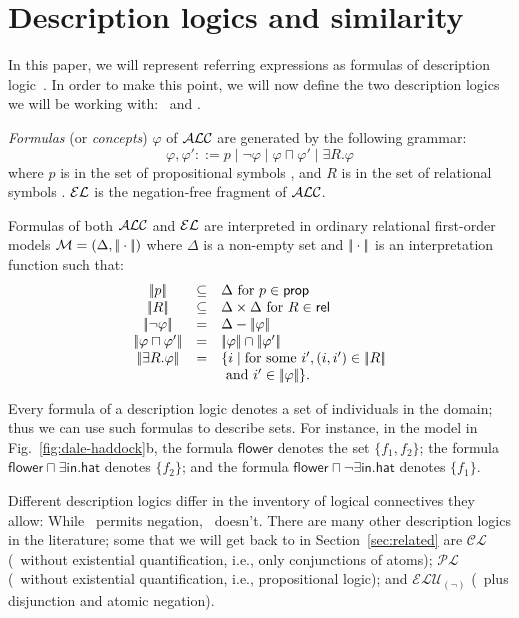 \section{Description logics and similarity}
\label{sec:bisim}

In this paper, we will represent referring expressions as formulas of
description logic~\cite{baad:desc03}.  In order to make this point, we
will now define the two description logics we will be working with:
\alc\ and \el.

\emph{Formulas} (or \emph{concepts}) $\varphi$ of $\mathcal{ALC}$ are generated
by the following grammar:
$$
\varphi,\varphi' ::= p \mid \neg \varphi \mid \varphi \sqcap \varphi'
\mid \exists R. \varphi
$$
where $p$ is in the set of propositional symbols \prop, and $R$ is in
the set of relational symbols \rel. $\mathcal{EL}$ is the negation-free
fragment of $\mathcal{ALC}$.

Formulas of both $\mathcal{ALC}$ and $\mathcal{EL}$ are interpreted in ordinary
relational first-order models $\mathcal{M} = (\Delta,|\!|\cdot|\!|)$ where
$\Delta$ is a non-empty set and $|\!|\cdot|\!|$ is an
interpretation function such that:
$$
\begin{array}{ccl}
\interp{p} & \subseteq & \Delta  \mbox{ for $p \in \prop$}\\
\interp{R} & \subseteq & \Delta \times \Delta  \mbox{ for $R \in \rel$}\\
\interp{\neg \varphi} & = & \Delta - \interp{\varphi}\\
\interp{\varphi \sqcap \varphi'} & = & \interp{\varphi} \cap \interp{\varphi'}\\
\interp{\exists R.\varphi} & = & \{i \mid \mbox{for some } i', (i,i') \in \interp{R}\\
& & \mbox{ and } i' \in \interp{\varphi} \}.\\
\end{array}
$$


Every formula of a description logic denotes a set of individuals in
the domain; thus we can use such formulas to describe sets.  For
instance, in the model in Fig.~\ref{fig:dale-haddock}b, the formula
$\mathsf{flower}$ denotes the set $\{f_1,f_2\}$; the formula
$\mathsf{flower} \sqcap \exists \mathsf{in}.\mathsf{hat}$ denotes
$\{f_2\}$; and the formula $\mathsf{flower} \sqcap \neg
\exists \mathsf{in}.\mathsf{hat}$ denotes $\{f_1\}$.

Different description logics differ in the inventory of logical
connectives they allow: While \alc\ permits negation, \el\
doesn't. There are many other description logics in the literature;
some that we will get back to in Section~\ref{sec:related} are
$\mathcal{CL}$ (\el\ without existential quantification, i.e., only
conjunctions of atoms); $\mathcal{PL}$ (\alc\ without existential
quantification, i.e., propositional logic); and
$\mathcal{ELU}_{(\neg)}$ (\el\ plus disjunction and atomic negation).

